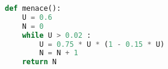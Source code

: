 \begin{lstlisting}[language=python]
def menace():
	U = 0.6
	N = 0
	while U > 0.02 :
		U = 0.75 * U * (1 - 0.15 * U)
		N = N + 1
	return N
\end{lstlisting}